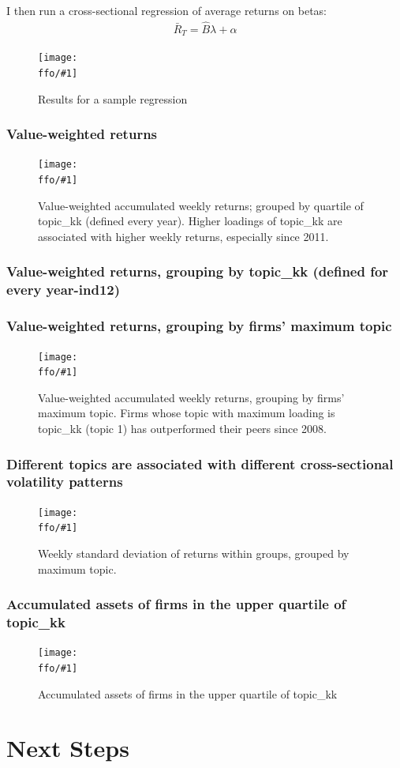 \documentclass{beamer}
\newcommand{\ffo}{dicfullmc10thr10defnob40noa0_8_4t}
\newcommand{\insertfigure}[2]{
\begin{figure}[h!]
  \centering
  \texttt{[image: \\ffo/\#1]}
  \centering
  \captionsetup{font=scriptsize}
  \caption{#2}
  \label{fig:#1}
\end{figure}
}
\begin{document}
\begin{frame}
I then run a cross-sectional regression of average returns on betas:
\begin{align}
\bar{R}_T=\widehat{B} \lambda+\alpha
\end{align}
\end{frame}


\begin{frame}
	\insertfigure{regr}{Results for a sample regression}
\end{frame}

\begin{frame}
\frametitle{Value-weighted returns}
\insertfigure{awawr}{Value-weighted accumulated weekly returns; grouped by quartile of topic\_kk (defined every year). Higher loadings of topic\_kk are associated with higher weekly returns, especially since 2011. }
\end{frame}



\begin{frame}
\frametitle{Value-weighted returns, grouping by topic\_kk (defined for every year-ind12)}
\end{frame}

\begin{frame}
\frametitle{Value-weighted returns, grouping by firms' maximum topic}
\insertfigure{awawr_byg}{Value-weighted accumulated weekly returns, grouping by firms' maximum topic. Firms whose topic with maximum loading is topic\_kk (topic 1) has outperformed their peers since 2008.}
\end{frame}

\begin{frame}
\frametitle{Different topics are associated with different cross-sectional volatility patterns}
\insertfigure{wsdr_byg}{Weekly standard deviation of returns within groups, grouped by maximum topic.}
\end{frame}

\begin{frame}
\frametitle{Accumulated assets of firms in the upper quartile of topic\_kk}
\insertfigure{stackedplot_at}{Accumulated assets of firms in the upper quartile of topic\_kk}
\end{frame}



\section{Next Steps}
\end{document}
